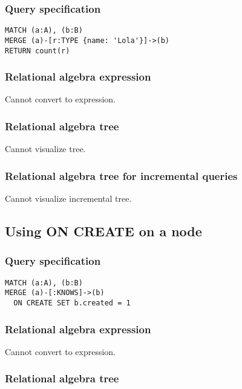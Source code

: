 \subsubsection*{Query specification}

\begin{lstlisting}
MATCH (a:A), (b:B)
MERGE (a)-[r:TYPE {name: 'Lola'}]->(b)
RETURN count(r)
\end{lstlisting}

\subsubsection*{Relational algebra expression}

Cannot convert to expression.

\subsubsection*{Relational algebra tree}

Cannot visualize tree.

\subsubsection*{Relational algebra tree for incremental queries}

Cannot visualize incremental tree.

\subsection{Using ON CREATE on a node}

\subsubsection*{Query specification}

\begin{lstlisting}
MATCH (a:A), (b:B)
MERGE (a)-[:KNOWS]->(b)
  ON CREATE SET b.created = 1
\end{lstlisting}

\subsubsection*{Relational algebra expression}

Cannot convert to expression.

\subsubsection*{Relational algebra tree}

